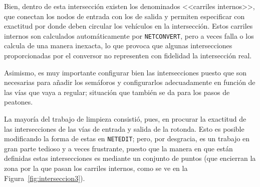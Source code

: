 Bien, dentro de esta intersección existen los denominados <<carriles internos>>, que conectan los nodos de entrada con los de salida y permiten especificar con exactitud por donde deben circular los vehículos en la intersección. Estos carriles internos son calculados automáticamente por \texttt{NETCONVERT}, pero a veces falla o los calcula de una manera inexacta, lo que provoca que algunas intersecciones proporcionadas por el conversor no representen con fidelidad la  intersección real.

Asimismo, es muy importante configurar bien las intersecciones puesto que son necesarias para añadir los semáforos y configurarlos adecuadamente en función de las vías que vaya a regular; situación que también se da para los pasos de peatones.

La mayoría del trabajo de limpieza consistió, pues, en procurar la exactitud de las intersecciones de las vías de entrada y salida de la rotonda. Esto es posible modificando la forma de estas en \texttt{NETEDIT}; pero, por desgracia, es un trabajo en gran parte tedioso y a veces frustrante, puesto que la manera en que están definidas estas intersecciones es mediante un conjunto de puntos (que encierran la zona por la que pasan los carriles internos, como se ve en la Figura~\ref{fig:interseccion3}). 

